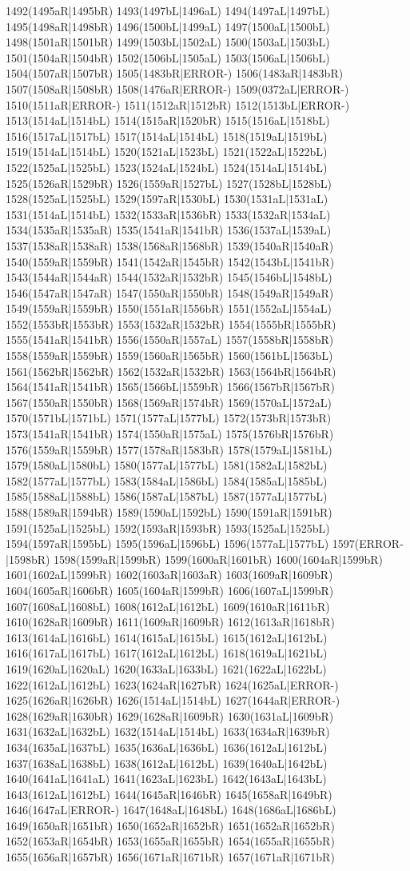 1492(1495aR|1495bR) 1493(1497bL|1496aL) 1494(1497aL|1497bL) 1495(1498aR|1498bR) 1496(1500bL|1499aL) 1497(1500aL|1500bL) 1498(1501aR|1501bR) 1499(1503bL|1502aL) 1500(1503aL|1503bL) 1501(1504aR|1504bR) 1502(1506bL|1505aL) 1503(1506aL|1506bL) 1504(1507aR|1507bR) 1505(1483bR|ERROR-) 1506(1483aR|1483bR) 1507(1508aR|1508bR) 1508(1476aR|ERROR-) 1509(0372aL|ERROR-) 1510(1511aR|ERROR-) 1511(1512aR|1512bR) 1512(1513bL|ERROR-) 1513(1514aL|1514bL) 1514(1515aR|1520bR) 1515(1516aL|1518bL) 1516(1517aL|1517bL) 1517(1514aL|1514bL) 1518(1519aL|1519bL) 1519(1514aL|1514bL) 1520(1521aL|1523bL) 1521(1522aL|1522bL) 1522(1525aL|1525bL) 1523(1524aL|1524bL) 1524(1514aL|1514bL) 1525(1526aR|1529bR) 1526(1559aR|1527bL) 1527(1528bL|1528bL) 1528(1525aL|1525bL) 1529(1597aR|1530bL) 1530(1531aL|1531aL) 1531(1514aL|1514bL) 1532(1533aR|1536bR) 1533(1532aR|1534aL) 1534(1535aR|1535aR) 1535(1541aR|1541bR) 1536(1537aL|1539aL) 1537(1538aR|1538aR) 1538(1568aR|1568bR) 1539(1540aR|1540aR) 1540(1559aR|1559bR) 1541(1542aR|1545bR) 1542(1543bL|1541bR) 1543(1544aR|1544aR) 1544(1532aR|1532bR) 1545(1546bL|1548bL) 1546(1547aR|1547aR) 1547(1550aR|1550bR) 1548(1549aR|1549aR) 1549(1559aR|1559bR) 1550(1551aR|1556bR) 1551(1552aL|1554aL) 1552(1553bR|1553bR) 1553(1532aR|1532bR) 1554(1555bR|1555bR) 1555(1541aR|1541bR) 1556(1550aR|1557aL) 1557(1558bR|1558bR) 1558(1559aR|1559bR) 1559(1560aR|1565bR) 1560(1561bL|1563bL) 1561(1562bR|1562bR) 1562(1532aR|1532bR) 1563(1564bR|1564bR) 1564(1541aR|1541bR) 1565(1566bL|1559bR) 1566(1567bR|1567bR) 1567(1550aR|1550bR) 1568(1569aR|1574bR) 1569(1570aL|1572aL) 1570(1571bL|1571bL) 1571(1577aL|1577bL) 1572(1573bR|1573bR) 1573(1541aR|1541bR) 1574(1550aR|1575aL) 1575(1576bR|1576bR) 1576(1559aR|1559bR) 1577(1578aR|1583bR) 1578(1579aL|1581bL) 1579(1580aL|1580bL) 1580(1577aL|1577bL) 1581(1582aL|1582bL) 1582(1577aL|1577bL) 1583(1584aL|1586bL) 1584(1585aL|1585bL) 1585(1588aL|1588bL) 1586(1587aL|1587bL) 1587(1577aL|1577bL) 1588(1589aR|1594bR) 1589(1590aL|1592bL) 1590(1591aR|1591bR) 1591(1525aL|1525bL) 1592(1593aR|1593bR) 1593(1525aL|1525bL) 1594(1597aR|1595bL) 1595(1596aL|1596bL) 1596(1577aL|1577bL) 1597(ERROR-|1598bR) 1598(1599aR|1599bR) 1599(1600aR|1601bR) 1600(1604aR|1599bR) 1601(1602aL|1599bR) 1602(1603aR|1603aR) 1603(1609aR|1609bR) 1604(1605aR|1606bR) 1605(1604aR|1599bR) 1606(1607aL|1599bR) 1607(1608aL|1608bL) 1608(1612aL|1612bL) 1609(1610aR|1611bR) 1610(1628aR|1609bR) 1611(1609aR|1609bR) 1612(1613aR|1618bR) 1613(1614aL|1616bL) 1614(1615aL|1615bL) 1615(1612aL|1612bL) 1616(1617aL|1617bL) 1617(1612aL|1612bL) 1618(1619aL|1621bL) 1619(1620aL|1620aL) 1620(1633aL|1633bL) 1621(1622aL|1622bL) 1622(1612aL|1612bL) 1623(1624aR|1627bR) 1624(1625aL|ERROR-) 1625(1626aR|1626bR) 1626(1514aL|1514bL) 1627(1644aR|ERROR-) 1628(1629aR|1630bR) 1629(1628aR|1609bR) 1630(1631aL|1609bR) 1631(1632aL|1632bL) 1632(1514aL|1514bL) 1633(1634aR|1639bR) 1634(1635aL|1637bL) 1635(1636aL|1636bL) 1636(1612aL|1612bL) 1637(1638aL|1638bL) 1638(1612aL|1612bL) 1639(1640aL|1642bL) 1640(1641aL|1641aL) 1641(1623aL|1623bL) 1642(1643aL|1643bL) 1643(1612aL|1612bL) 1644(1645aR|1646bR) 1645(1658aR|1649bR) 1646(1647aL|ERROR-) 1647(1648aL|1648bL) 1648(1686aL|1686bL) 1649(1650aR|1651bR) 1650(1652aR|1652bR) 1651(1652aR|1652bR) 1652(1653aR|1654bR) 1653(1655aR|1655bR) 1654(1655aR|1655bR) 1655(1656aR|1657bR) 1656(1671aR|1671bR) 1657(1671aR|1671bR) 